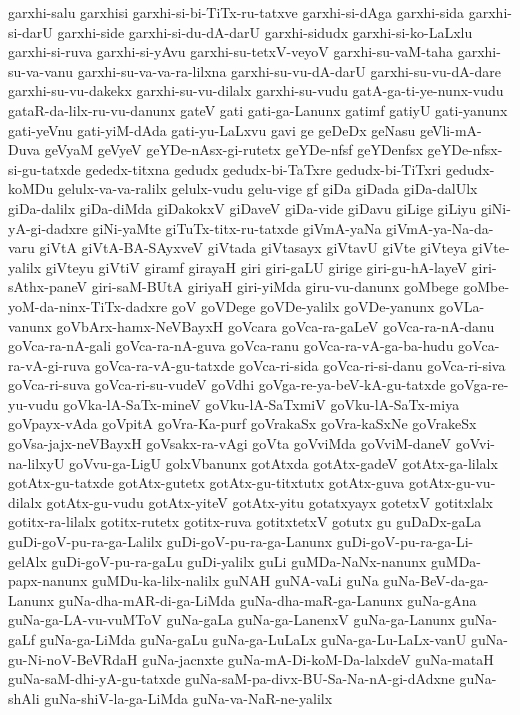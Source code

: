 {garxhi-salu
garxhisi
garxhi-si-bi-TiTx-ru-tatxve
garxhi-si-dAga
garxhi-sida
garxhi-si-darU
garxhi-side
garxhi-si-du-dA-darU
garxhi-sidudx
garxhi-si-ko-LaLxlu
garxhi-si-ruva
garxhi-si-yAvu
garxhi-su-tetxV-veyoV
garxhi-su-vaM-taha
garxhi-su-va-vanu
garxhi-su-va-va-ra-lilxna
garxhi-su-vu-dA-darU
garxhi-su-vu-dA-dare
garxhi-su-vu-dakekx
garxhi-su-vu-dilalx
garxhi-su-vudu
gatA-ga-ti-ye-nunx-vudu
gataR-da-lilx-ru-vu-danunx
gateV
gati
gati-ga-Lanunx
gatimf
gatiyU
gati-yanunx
gati-yeVnu
gati-yiM-dAda
gati-yu-LaLxvu
gavi
ge
geDeDx
geNasu
geVli-mA-Duva
geVyaM
geVyeV
geYDe-nAsx-gi-rutetx
geYDe-nfsf
geYDenfsx
geYDe-nfsx-si-gu-tatxde
gededx-titxna
gedudx
gedudx-bi-TaTxre
gedudx-bi-TiTxri
gedudx-koMDu
gelulx-va-va-ralilx
gelulx-vudu
gelu-vige
gf
giDa
giDada
giDa-dalUlx
giDa-dalilx
giDa-diMda
giDakokxV
giDaveV
giDa-vide
giDavu
giLige
giLiyu
giNi-yA-gi-dadxre
giNi-yaMte
giTuTx-titx-ru-tatxde
giVmA-yaNa
giVmA-ya-Na-da-varu
giVtA
giVtA-BA-SAyxveV
giVtada
giVtasayx
giVtavU
giVte
giVteya
giVte-yalilx
giVteyu
giVtiV
giramf
girayaH
giri
giri-gaLU
girige
giri-gu-hA-layeV
giri-sAthx-paneV
giri-saM-BUtA
giriyaH
giri-yiMda
giru-vu-danunx
goMbege
goMbe-yoM-da-ninx-TiTx-dadxre
goV
goVDege
goVDe-yalilx
goVDe-yanunx
goVLa-vanunx
goVbArx-hamx-NeVBayxH
goVcara
goVca-ra-gaLeV
goVca-ra-nA-danu
goVca-ra-nA-gali
goVca-ra-nA-guva
goVca-ranu
goVca-ra-vA-ga-ba-hudu
goVca-ra-vA-gi-ruva
goVca-ra-vA-gu-tatxde
goVca-ri-sida
goVca-ri-si-danu
goVca-ri-siva
goVca-ri-suva
goVca-ri-su-vudeV
goVdhi
goVga-re-ya-beV-kA-gu-tatxde
goVga-re-yu-vudu
goVka-lA-SaTx-mineV
goVku-lA-SaTxmiV
goVku-lA-SaTx-miya
goVpayx-vAda
goVpitA
goVra-Ka-purf
goVrakaSx
goVra-kaSxNe
goVrakeSx
goVsa-jajx-neVBayxH
goVsakx-ra-vAgi
goVta
goVviMda
goVviM-daneV
goVvi-na-lilxyU
goVvu-ga-LigU
golxVbanunx
gotAtxda
gotAtx-gadeV
gotAtx-ga-lilalx
gotAtx-gu-tatxde
gotAtx-gutetx
gotAtx-gu-titxtutx
gotAtx-guva
gotAtx-gu-vu-dilalx
gotAtx-gu-vudu
gotAtx-yiteV
gotAtx-yitu
gotatxyayx
gotetxV
gotitxlalx
gotitx-ra-lilalx
gotitx-rutetx
gotitx-ruva
gotitxtetxV
gotutx
gu
guDaDx-gaLa
guDi-goV-pu-ra-ga-Lalilx
guDi-goV-pu-ra-ga-Lanunx
guDi-goV-pu-ra-ga-Li-gelAlx
guDi-goV-pu-ra-gaLu
guDi-yalilx
guLi
guMDa-NaNx-nanunx
guMDa-papx-nanunx
guMDu-ka-lilx-nalilx
guNAH
guNA-vaLi
guNa
guNa-BeV-da-ga-Lanunx
guNa-dha-mAR-di-ga-LiMda
guNa-dha-maR-ga-Lanunx
guNa-gAna
guNa-ga-LA-vu-vuMToV
guNa-gaLa
guNa-ga-LanenxV
guNa-ga-Lanunx
guNa-gaLf
guNa-ga-LiMda
guNa-gaLu
guNa-ga-LuLaLx
guNa-ga-Lu-LaLx-vanU
guNa-gu-Ni-noV-BeVRdaH
guNa-jacnxte
guNa-mA-Di-koM-Da-lalxdeV
guNa-mataH
guNa-saM-dhi-yA-gu-tatxde
guNa-saM-pa-divx-BU-Sa-Na-nA-gi-dAdxne
guNa-shAli
guNa-shiV-la-ga-LiMda
guNa-va-NaR-ne-yalilx
}
